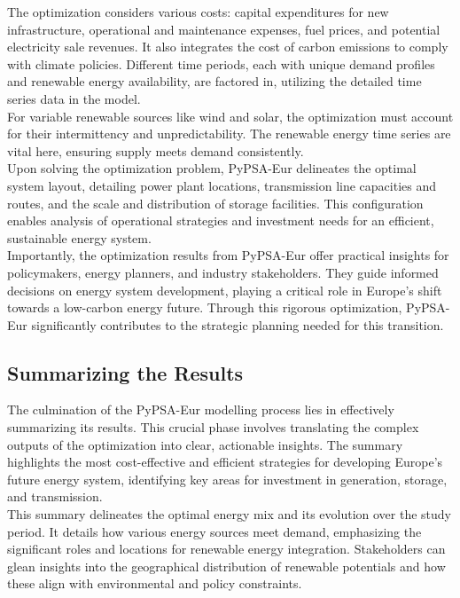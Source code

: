The optimization considers various costs: capital expenditures for new infrastructure, operational and maintenance expenses, fuel prices, and potential electricity sale revenues. It also integrates the cost of carbon emissions to comply with climate policies. Different time periods, each with unique demand profiles and renewable energy availability, are factored in, utilizing the detailed time series data in the model.\\

For variable renewable sources like wind and solar, the optimization must account for their intermittency and unpredictability. The renewable energy time series are vital here, ensuring supply meets demand consistently.\\

Upon solving the optimization problem, PyPSA-Eur delineates the optimal system layout, detailing power plant locations, transmission line capacities and routes, and the scale and distribution of storage facilities. This configuration enables analysis of operational strategies and investment needs for an efficient, sustainable energy system.\\

Importantly, the optimization results from PyPSA-Eur offer practical insights for policymakers, energy planners, and industry stakeholders. They guide informed decisions on energy system development, playing a critical role in Europe's shift towards a low-carbon energy future. Through this rigorous optimization, PyPSA-Eur significantly contributes to the strategic planning needed for this transition.

\subsection{Summarizing the Results}
The culmination of the PyPSA-Eur modelling process lies in effectively summarizing its results. This crucial phase involves translating the complex outputs of the optimization into clear, actionable insights. The summary highlights the most cost-effective and efficient strategies for developing Europe's future energy system, identifying key areas for investment in generation, storage, and transmission.\\

This summary delineates the optimal energy mix and its evolution over the study period. It details how various energy sources meet demand, emphasizing the significant roles and locations for renewable energy integration. Stakeholders can glean insights into the geographical distribution of renewable potentials and how these align with environmental and policy constraints.\\

